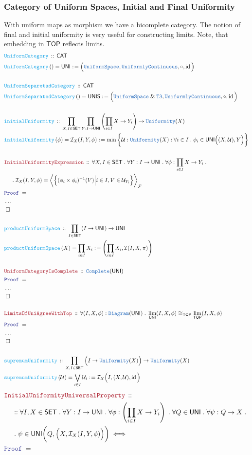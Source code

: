 \documentclass[12pt]{scrartcl}
\newcommand{\TYPE}[1]{\textcolor{NavyBlue}{\mathtt{#1}}}
\newcommand{\FUNC}[1]{\textcolor{Cerulean}{\mathtt{#1}}}
\newcommand{\LOGIC}[1]{\textcolor{Blue}{\mathtt{#1}}}
\newcommand{\THM}[1]{\textcolor{Maroon}{\mathtt{#1}}}
\renewcommand{\.}{\; . \;}
\newcommand{\de}{: \kern 0.1pc =}
\newcommand{\Act}[1]{\left( #1 \right)}
\newcommand{\Theorem}[2]{& \THM{#1} \, :: \, #2 \\ & \Proof = \\ }
\newcommand{\DeclareFunc}[2]{& \FUNC{#1} \, :: \, #2 \\}
\newcommand{\DefineNamedFunc}[4]{&  \FUNC{#1}\Act{#2} = #3 \de #4 \\}
\newcommand{\NewLine}{\\ & \kern 1pc}
\newcommand{\Page}[1]{ \begin{align*} #1 \end{align*}   }
\newcommand{\NoProof}{ & \ldots \\ \EndProof}
\renewcommand{\And}{\; \& \;}
\DeclareMathOperator*{\id}{id}
\newcommand{\QED}{\; \square}
\newcommand{\EndProof}{& \QED \\}
\newcommand{\Proof}{\LOGIC{Proof} \; }
\newcommand{\I}{\mathcal{I}}
\newcommand{\CAT}{\mathsf{CAT}}
\newcommand{\SET}{\mathsf{SET}}
\newcommand{\TOP}{\mathsf{TOP}}
\renewcommand{\U}{\mathcal{U}}
\newcommand{\F}{\mathcal{F}}
\newcommand{\UNI}{\mathsf{UNI}}
\newcommand{\UNIS}{\mathsf{UNIS}}
\newcommand{\Unif}{\TYPE{Uniformity}}
\newcommand{\US}{\TYPE{UniformSpace}}
\newcommand{\UC}{\TYPE{UniformlyContinuous}}
\begin{document}
\subsubsection{Category of Uniform Spaces, Initial and Final Uniformity}
With uniform maps as morphism we have a bicomplete category. 
The notion of final and initial uniformity is very useful for constructing limits.
Note, that embedding in $\TOP$ reflects limits.
\Page{
	\DeclareFunc{UniformCategory}{\CAT}
	\DefineNamedFunc{UniformCategory}{}{\UNI}
	{
		\Big( \US, \UC, \circ, \id \Big)
	}
	\\
	\DeclareFunc{UniformSeparetadCategory}{\CAT}
	\DefineNamedFunc{UniformSeparatedCategory}{}{\UNIS}
	{
		\Big( \US \And \TYPE{T3}, \UC, \circ, \id \Big)
	}
	\\
	\DeclareFunc{initialUniformity}
	{
		\prod_{X,I \in \SET} \prod_{Y:I \to \UNI}  
		\left(\prod_{i \in I}  X \to Y_i  \right) \to \Unif(X) 	
	}
	\DefineNamedFunc{initialUniformity}{\phi}{\I_X(I,Y,\phi)}
	{
		\min \bigg\{ 
			\U : \Unif(X) : 
			\forall i \in I \. 
			\phi_i \in \UNI\Big((X,\U), Y \Big) 
		\bigg\}	
	}
	\\
	\Theorem{InitialUniformityExpression}
	{
		\forall X,I \in \SET \.
		\forall Y : I \to \UNI \.
		\forall \phi : \prod_{i \in I}  X \to Y_i \. \NewLine \.
		\I_X(I,Y,\phi) = 
			\bigg\langle\Big\{ 
				(\phi_i \times \phi_i)^{-1}(V) 
				\Big|
				    i \in I, V \in \U_{Y_i}
				\Big\} 
			\bigg\rangle_\F
	}
	\NoProof
	\\
	\DeclareFunc{productUniformSpace}
	{
		\prod_{I \in \SET} (I \to \UNI) \to \UNI
	}
	\DefineNamedFunc{productUniformSpace}{X}{\prod_{i \in I} X_i}
	{\left( \prod_{i \in I} X_i ,\I(I,X,\pi)\right)}
	\\
	\Theorem{UniformCategoryIsComplete}
	{
		\TYPE{Complete}(\UNI)
	}
	\NoProof
	\\
	\Theorem{LimitsOfUniAgreeWithTop}
	{
		\forall (I,X,\phi) : \TYPE{Diagram}(\UNI) \.
		\lim_{\UNI} (I,X,\phi) \cong_\TOP \lim_{\TOP} (I,X,\phi)
	}
	\NoProof
	\\
	\DeclareFunc{supremumUniformity}
	{
		\prod_{X,I \in \SET} \Big(I \to \Unif(X)\Big) \to \Unif(X)
	}
	\DefineNamedFunc{supremumUniformity}{\U}{\bigvee_{i \in I} \U_i}
	{
		\I_X\Big(I,(X,\U),\id\Big)	
	}
}\Page{
	\Theorem{InitialUniformityUniversalProperty}
	{
		\NewLine ::		
		\forall I,X \in \SET \.
		\forall Y : I \to \UNI \.
		\forall \phi : \left(\prod_{i \in I} X \to Y_i  \right) \. 
		\forall Q \in \UNI \.
		\forall \psi : Q \to X \. \NewLine \.
		\psi \in \UNI\bigg(Q,\Big(X, \I_X(I,Y,\phi) \Big)\bigg) \iff
}}
\end{document}
